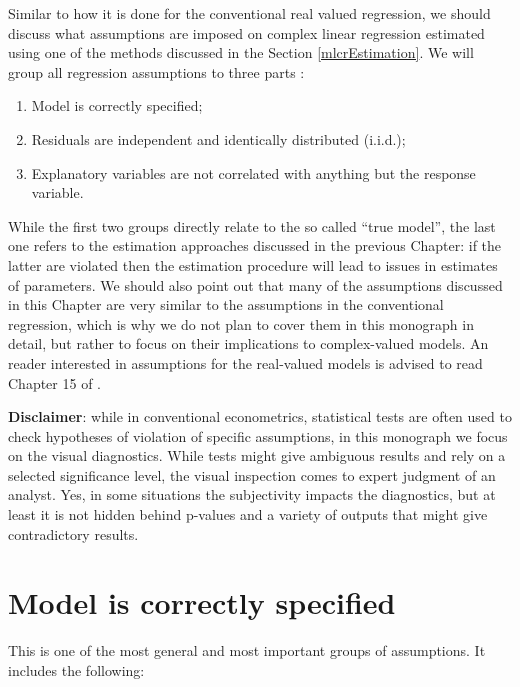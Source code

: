 \documentclass[
]{book}
\providecommand{\tightlist}{%
  \setlength{\itemsep}{0pt}\setlength{\parskip}{0pt}}
\begin{document}
Similar to how it is done for the conventional real valued regression, we should discuss what assumptions are imposed on complex linear regression estimated using one of the methods discussed in the Section \ref{mlcrEstimation}. We will group all regression assumptions to three parts \citep[similar to how it was done by][]{SvetunkovAdam}:

\begin{enumerate}
\def\labelenumi{\arabic{enumi}.}
\tightlist
\item
  Model is correctly specified;
\item
  Residuals are independent and identically distributed (i.i.d.);
\item
  Explanatory variables are not correlated with anything but the response variable.
\end{enumerate}

While the first two groups directly relate to the so called ``true model'', the last one refers to the estimation approaches discussed in the previous Chapter: if the latter are violated then the estimation procedure will lead to issues in estimates of parameters. We should also point out that many of the assumptions discussed in this Chapter are very similar to the assumptions in the conventional regression, which is why we do not plan to cover them in this monograph in detail, but rather to focus on their implications to complex-valued models. An reader interested in assumptions for the real-valued models is advised to read Chapter 15 of \citet{SvetunkovSBA}.

\textbf{Disclaimer}: while in conventional econometrics, statistical tests are often used to check hypotheses of violation of specific assumptions, in this monograph we focus on the visual diagnostics. While tests might give ambiguous results and rely on a selected significance level, the visual inspection comes to expert judgment of an analyst. Yes, in some situations the subjectivity impacts the diagnostics, but at least it is not hidden behind p-values and a variety of outputs that might give contradictory results.

\hypertarget{assumptionsSpecification}{%
\section{Model is correctly specified}\label{assumptionsSpecification}}

This is one of the most general and most important groups of assumptions. It includes the following:
\end{document}
